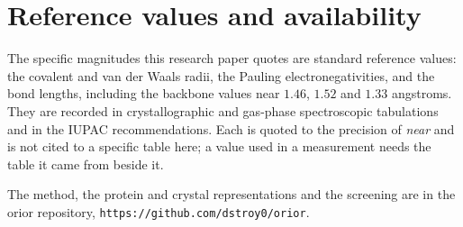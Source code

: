 \chapter{Reference values and availability}

The specific magnitudes this research paper quotes are standard reference values: the covalent and
van der Waals radii, the Pauling electronegativities, and the bond lengths, including the backbone
values near $1.46$, $1.52$ and $1.33$ angstroms. They are recorded in crystallographic and gas-phase
spectroscopic tabulations and in the IUPAC recommendations. Each is quoted to the precision of
\emph{near} and is not cited to a specific table here; a value used in a measurement needs the table
it came from beside it.

The method, the protein and crystal representations and the screening are in the orior repository,
\texttt{https://github.com/dstroy0/orior}.
